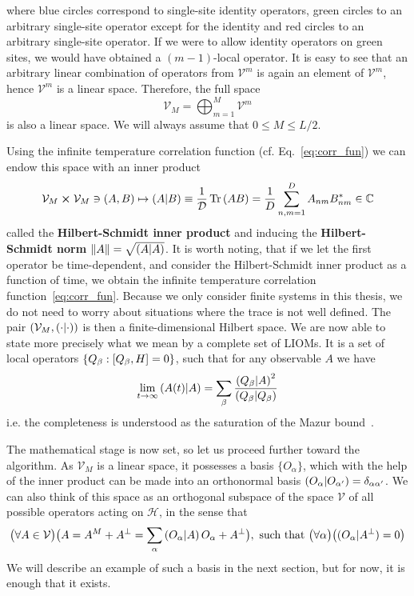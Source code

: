 where blue circles correspond to single-site identity operators, green circles to an arbitrary
single-site operator except for the identity and red circles to an arbitrary single-site operator.
If we were to allow identity operators on green sites, we would have obtained a \((m-1)\)-local operator.
It is easy to see that an arbitrary linear combination of operators from \(\mathcal{V}^m\) is again
an element of \(\mathcal{V}^m\), hence \(\mathcal{V}^m\) is a linear space. Therefore,
the full space
\begin{equation}
    \mathcal{V}_{M} = \bigoplus_{m=1}^{M} \mathcal{V}^m
\end{equation}
is also a linear space. We will always assume that \(0\leq M \leq L/2\).

Using the infinite temperature correlation function (cf. Eq.~\eqref{eq:corr_fun}) we can endow this space with an inner product
\begin{equation}
    \mathcal{V}_M \cross \mathcal{V}_M \ni (A, B) \mapsto \left(A \middle| B\right)
    \equiv \frac{1}{\mathcal{D}}\Tr\left(AB\right) = \frac{1}{D}\sum_{n,m = 1}^{D} A_{nm} B_{nm}^{\ast} \in \mathbb{C}
    \label{eq:hs_prod}
\end{equation}
called the \textbf{Hilbert-Schmidt inner product} and
inducing the \textbf{Hilbert-Schmidt norm} \(\norm{A} = \sqrt{\left(A \middle| A\right)}\). It is worth noting, that
if we let the first operator be time-dependent, and consider the Hilbert-Schmidt inner product
as a function of time, we obtain the infinite temperature correlation function~\eqref{eq:corr_fun}.
Because we only consider finite systems in this thesis, we do not need to worry about
situations where the trace is not well defined. The pair \( (\mathcal{V}_M, \left(\cdot \middle| \cdot\right)) \)
is then a finite-dimensional Hilbert space.
We are now able to state more precisely what we mean by a complete set of LIOMs.
It is a set of local operators \(\{Q_{\beta} : \comm{Q_{\beta}}{H} = 0\}\), such that
for any observable \(A\) we have
\begin{equation}
    \lim_{t\to\infty} \left(A(t) \middle| A\right) = \sum_{\beta} \frac{\left(Q_{\beta} \middle| A\right)^2}{\left(Q_{\beta} \middle| Q_{\beta}\right)}
\end{equation}
i.e. the completeness is understood as the saturation of the Mazur bound~\autocite{Mazur1969}.

The mathematical stage is now set, so let us proceed further toward the algorithm. 
As \(\mathcal{V}_M\) is a linear space, it possesses a basis \(\{O_{\alpha}\}\),
which with the help of the inner product can be made into an orthonormal basis \(\left(O_{\alpha} \middle| O_{\alpha^{\prime}}\right) = \delta_{\alpha\alpha^{\prime}}\).
We can also think of this space as an orthogonal subspace of the space \(\mathcal{V}\) of all possible operators
acting on \(\mathcal{H}\), in the sense that
\begin{equation}
    \big(\forall A \in \mathcal{V} \big) \big( A = A^M + A^{\perp} = \sum_{\alpha} \left(O_{\alpha} \middle| A\right) O_{\alpha} + A^{\perp}\big) ,
    \text{ such that } \big(\forall \alpha\big) \big( ({O_{\alpha}}|{A^{\perp}}) = 0\big)
    \label{eq:decomposition}
  \end{equation}
We will describe an example of such a basis in the next section, but for now, it is enough that it exists.

